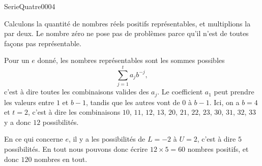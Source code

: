 
\begin{corrige}{SerieQuatre0004}

	Calculons la quantité de nombres réels positifs représentables, et multiplions la par deux. Le nombre zéro ne pose pas de problèmes parce qu'il n'est de toutes façons pas représentable.

	Pour un $e$ donné, les nombres représentables sont les sommes possibles
	\begin{equation}
		\sum_{j=1}^ta_jb^{-j},
	\end{equation}
	c'est à dire toutes les combinaisons valides des $a_j$. Le coefficient $a_1$ peut prendre les valeurs entre $1$ et $b-1$, tandis que les autres vont de $0$ à $b-1$. Ici, on a $b=4$ et $t=2$, c'est à dire les combinaisons $10$, $11$, $12$, $13$, $20$, $21$, $22$, $23$, $30$, $31$, $32$, $33$ y a donc $12$ possibilités.
	
	En ce qui concerne $e$, il y a les possibilités de $L=-2$ à $U=2$, c'est à dire $5$ possibilités. En tout nous pouvons donc écrire $12\times 5=60$ nombres positifs, et donc $120$ nombres en tout.

\end{corrige}
